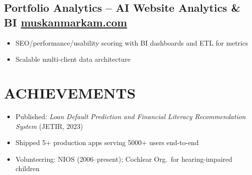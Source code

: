 \documentclass[10pt,a4paper]{article}
\newcommand{\project}[3]{
    \subsection{#1 \hfill \textcolor{primary}{\textbf{#2}}}
    \vspace{-2pt}
    #3
}
\def\hfill{ }%
\begin{document}
\vspace{3pt}
\project{Portfolio Analytics -- AI Website Analytics \& BI}{\href{https://muskanmarkam.com}{muskanmarkam.com}}{
\begin{itemize}
    \item SEO/performance/usability scoring with BI dashboards and ETL for metrics
    \item Scalable multi-client data architecture
\end{itemize}
}

\section{ACHIEVEMENTS}
\vspace{2pt}
\begin{itemize}
    \item Published: \textit{Loan Default Prediction and Financial Literacy Recommendation System} (JETIR, 2023)
    \item Shipped 5+ production apps serving 5000+ users end-to-end
    \item Volunteering: NIOS (2006--present); Cochlear Org.\ for hearing-impaired children
\end{itemize}
\end{document}
